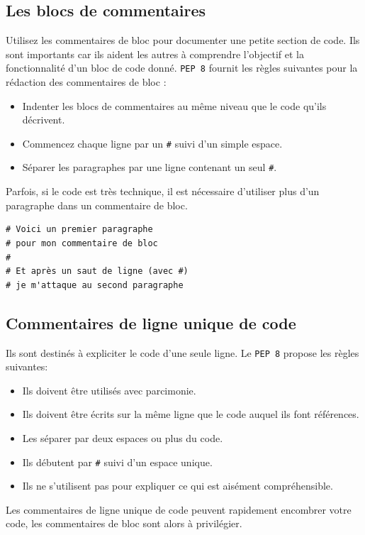 \documentclass[a4paper,12pt]{book}
\begin{document}
\subsection*{Les blocs de commentaires}
Utilisez les commentaires de bloc pour documenter une petite section de code. Ils sont importants car ils aident les autres à comprendre l'objectif et la fonctionnalité d'un bloc de code donné. \texttt{PEP 8} fournit les règles suivantes pour la rédaction des commentaires de bloc :
\begin{itemize}
	\item Indenter les blocs de commentaires au même niveau que le code qu'ils décrivent.
    \item Commencez chaque ligne par un \texttt{\#} suivi d'un simple espace.
    \item Séparer les paragraphes par une ligne contenant un seul \texttt{\#}.
\end{itemize}
\medskip

Parfois, si le code est très technique, il est nécessaire d'utiliser plus d'un paragraphe dans un commentaire de bloc.
\begin{lstlisting}
# Voici un premier paragraphe
# pour mon commentaire de bloc
#
# Et après un saut de ligne (avec #)
# je m'attaque au second paragraphe
\end{lstlisting}
\medskip

\subsection*{Commentaires de ligne unique de code}
Ils sont destinés à expliciter le code d'une seule ligne. Le \texttt{PEP 8} propose les règles suivantes:
\begin{itemize}
	\item Ils doivent être utilisés avec parcimonie.
	\item Ils doivent être écrits sur la même ligne que le code auquel ils font références.
	\item Les séparer par deux espaces ou plus du code.
	\item Ils débutent par \texttt{\#} suivi d'un espace unique.
	\item Ils ne s'utilisent pas pour expliquer ce qui est aisément compréhensible. 
\end{itemize} 
\medskip

Les commentaires de ligne unique de code peuvent rapidement encombrer votre code, les commentaires de bloc sont alors à privilégier.
\medskip
\end{document}
